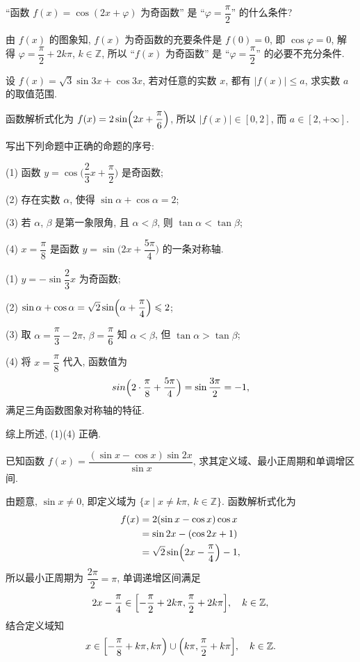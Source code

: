 \begin{exercise}
    ``函数 $f(x)=\cos(2x+\varphi)$ 为奇函数'' 是 
    ``$\varphi= \dfrac\pi2$'' 的什么条件?
\end{exercise}
\beginsolution
    由 $f(x)$ 的图象知, $f(x)$ 为奇函数的充要条件是 $f(0)=0$, 即 $\cos\varphi=0$, 解得 $\varphi= \dfrac\pi2+2k\pi$, $k\in\mathbb{Z}$, 所以 ``$f(x)$ 为奇函数'' 是 ``$\varphi= \dfrac\pi2$'' 的必要不充分条件.
\endsolution

\begin{exercise}
    设 $f(x)= \sqrt3 \sin3x+\cos3x$, 若对任意的实数 $x$, 都有 $|f(x)|\leqslant a$, 求实数 $a$ 的取值范围.
\end{exercise}
\beginsolution
    函数解析式化为 $f(x)= 2\sin\Bigl(2x+\dfrac\pi6\Bigr)$, 所以 $|f(x)|\in[0,2]$, 而 $a\in[2,+\infty]$.
\endsolution

\begin{exercise}
    写出下列命题中正确的命题的序号:
    
    (1) 函数 $y=\cos\Big(\dfrac23 x+\dfrac\pi2\Big)$ 是奇函数;
    
    (2) 存在实数 $\alpha$, 使得 $\sin \alpha+\cos \alpha=2$;
    
    (3) 若 $\alpha$, $\beta$ 是第一象限角, 且 $\alpha<\beta$, 
    则 $\tan \alpha<\tan \beta$;
    
    (4) $x= \dfrac\pi8$ 是函数 $y=\sin\Big(2x+\dfrac{5\pi}4\Big)$ 的一条对称轴.
\end{exercise}
\beginsolution
    (1) $y=-\sin\dfrac23 x$ 为奇函数;

    (2) $\sin\alpha+\cos\alpha= \sqrt2\sin\Bigl(\alpha+ \dfrac\pi4\Bigr)\leqslant 2$;

    (3) 取 $\alpha= \dfrac\pi3- 2\pi$, $\beta= \dfrac\pi6$ 知 $\alpha< \beta$, 但 $\tan\alpha> \tan\beta$;

    (4) 将 $x=\dfrac\pi8$ 代入, 函数值为
    \[sin\Bigl(2\cdot \frac\pi8+ \frac{5\pi}4\Bigr)
        = \sin\frac{3\pi}2= -1,\]
    满足三角函数图象对称轴的特征.

    综上所述, (1)(4) 正确.
\endsolution

\begin{exercise}
    已知函数 $f(x)= \dfrac{(\sin x- \cos x) \sin 2x}{\sin x}$, 求其定义域、最小正周期和单调增区间.
\end{exercise}
\beginsolution
    由题意, $\sin x\neq 0$, 即定义域为 $\{x\mid x\neq k\pi,\ k\in\mathbb{Z}\}$. 函数解析式化为
    \[\begin{aligned}
        f(x)&= 2(\sin x- \cos x)\cos x\\
        &= \sin 2x-(\cos2x+1)\\
        &= \sqrt2\sin\Bigl(2x- \frac\pi4\Bigr)-1,
    \end{aligned}\]
    所以最小正周期为 $\dfrac{2\pi}2= \pi$, 单调递增区间满足
    \[2x- \frac\pi4\in \Bigl[-\frac\pi2+2k\pi, \frac\pi2+2k\pi\Bigr],\quad k\in\mathbb{Z},\]
    结合定义域知
    \[x\in \Bigl[-\frac\pi8+k\pi, k\pi\Bigr)\cup \Bigl(k\pi, \frac\pi2+k\pi\Bigr],\quad k\in\mathbb{Z}.\]
\endsolution

